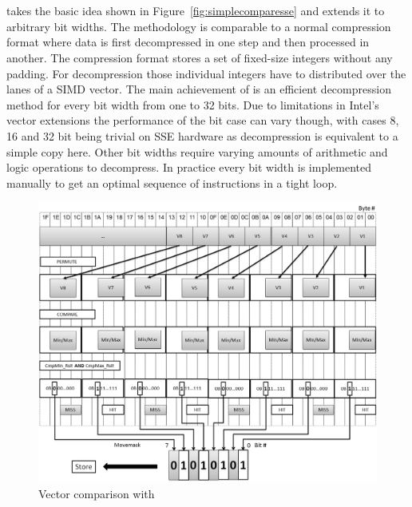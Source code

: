 \section{\simdscan{}}

\simdscan{} \cite{SIMD-Scan} takes the basic idea shown in
Figure~\ref{fig:simplecomparesse} and extends it to arbitrary bit widths. The
methodology is comparable to a normal compression format where data is first
decompressed in one step and then processed in another. The compression format
stores a set of fixed-size integers without any padding. For decompression those
individual integers have to distributed over the lanes of a SIMD vector. The
main achievement of \simdscan{} is an efficient decompression method for every
bit width from one to 32 bits. Due to limitations in Intel's vector extensions
the performance of the bit case can vary though, with cases 8, 16 and 32 bit
being trivial on SSE hardware as decompression is equivalent to a simple copy
here. Other bit widths require varying amounts of arithmetic and logic operations
to decompress. In practice every bit width is implemented manually to get an
optimal sequence of instructions in a tight loop.

\vspace{.5cm}

\begin{figure}[h] \begin{center}
\includegraphics[scale=.3]{images/scan.png}
\end{center}
\caption{Vector comparison with \simdscan{}~\cite{AVX2-Scan}}
\label{fig:simdscan}
\end{figure}

